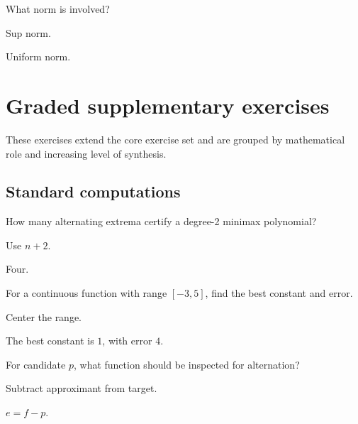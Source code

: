 \begin{exercise}\label{exr:ii23-08}
What norm is involved?
\end{exercise}
\begin{hint}
Sup norm.
\end{hint}
\begin{solution}
Uniform norm.
\end{solution}


\section{Graded supplementary exercises}
These exercises extend the core exercise set and are grouped by mathematical role and increasing level of synthesis.

\subsection*{Standard computations}

\begin{exercise}\label{exr:ii23-expand-01}
How many alternating extrema certify a degree-2 minimax polynomial?
\end{exercise}
\begin{hint}
Use \(n+2\).
\end{hint}
\begin{solution}
Four.
\end{solution}

\begin{exercise}\label{exr:ii23-expand-02}
For a continuous function with range \([-3,5]\), find the best constant and error.
\end{exercise}
\begin{hint}
Center the range.
\end{hint}
\begin{solution}
The best constant is \(1\), with error \(4\).
\end{solution}

\begin{exercise}\label{exr:ii23-expand-03}
For candidate \(p\), what function should be inspected for alternation?
\end{exercise}
\begin{hint}
Subtract approximant from target.
\end{hint}
\begin{solution}
\(e=f-p\).
\end{solution}

